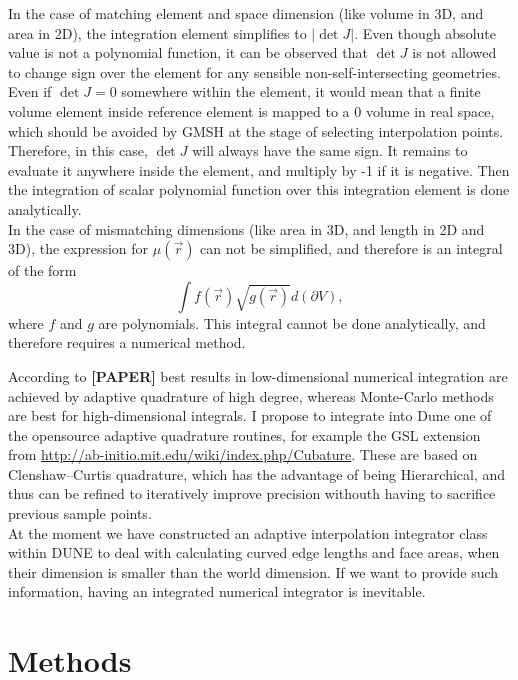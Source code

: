 \documentclass[12pt]{article}
\begin{document}
\noindent
In the case of matching element and space dimension (like volume in 3D, and area in 2D), the integration element simplifies to $|\det J|$. Even though absolute value is not a polynomial function, it can be observed that $\det J$ is not allowed to change sign over the element for any sensible non-self-intersecting geometries. Even if $\det J = 0$ somewhere within the element, it would mean that a finite volume element inside reference element is mapped to a 0 volume in real space, which should be avoided by GMSH at the stage of selecting interpolation points. Therefore, in this case, $\det J$ will always have the same sign. It remains to evaluate it anywhere inside the element, and multiply by -1 if it is negative. Then the integration of scalar polynomial function over this integration element is done analytically. \\

\noindent
In the case of mismatching dimensions (like area in 3D, and length in 2D and 3D), the expression for $\mu(\vec{r})$ can not be simplified, and therefore is an integral of the form \[\int f(\vec{r}) \sqrt{g(\vec{r})} d(\partial V),\] where $f$ and $g$ are polynomials. This integral cannot be done analytically, and therefore requires a numerical method.

\noindent
According to \textbf{[PAPER]} best results in low-dimensional numerical integration are achieved by adaptive quadrature of high degree, whereas Monte-Carlo methods are best for high-dimensional integrals. I propose to integrate into Dune one of the opensource adaptive quadrature routines, for example the GSL extension from \url{http://ab-initio.mit.edu/wiki/index.php/Cubature}. These are based on Clenshaw–Curtis quadrature, which has the advantage of being Hierarchical, and thus can be refined to iteratively improve precision withouth having to sacrifice previous sample points. \\

\noindent
At the moment we have constructed an adaptive interpolation integrator class within DUNE to deal with calculating curved edge lengths and face areas, when their dimension is smaller than the world dimension. If we want to provide such information, having an integrated numerical integrator is inevitable.


\section{Methods}
\end{document}
